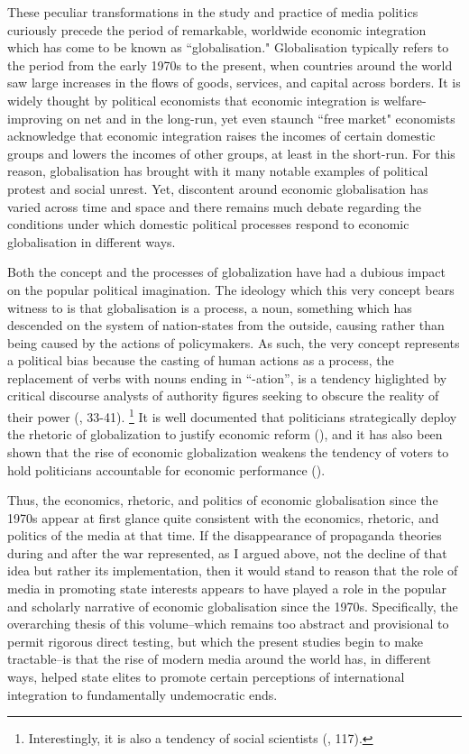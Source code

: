 These peculiar transformations in the study and practice of media politics curiously precede the
period of remarkable, worldwide economic integration which has come to be known as ``globalisation."
Globalisation typically refers to the period from the early 1970s to the present, when countries
around the world saw large increases in the flows of goods, services, and capital across borders. It
is widely thought by political economists that economic integration is welfare-improving on net and
in the long-run, yet even staunch ``free market" economists acknowledge that economic integration
raises the incomes of certain domestic groups and lowers the incomes of other groups, at least in
the short-run. For this reason, globalisation has brought with it many notable examples of political
protest and social unrest. Yet, discontent around economic globalisation has varied across time and
space and there remains much debate regarding the conditions under which domestic political
processes respond to economic globalisation in different ways.

Both the concept and the processes of globalization have had a dubious impact on the popular
political imagination. The ideology which this very concept bears witness to is that globalisation
is a process, a noun, something which has descended on the system of nation-states from the outside,
causing rather than being caused by the actions of policymakers. As such, the very concept
represents a political bias because the casting of human actions as a process, the replacement of
verbs with nouns ending in ``-ation'', is a tendency higlighted by critical discourse analysts of
authority figures seeking to obscure the reality of their power (\citealt{fowler1979language}, 33-41).
\footnote{Interestingly, it is also a tendency of social scientists (\citealt{billig2013learn}, 117).} It is well
documented that politicians strategically deploy the rhetoric of globalization to justify economic
reform (\citealt{Hay:2011dh}), and it has also been shown that the rise of economic globalization
weakens the tendency of voters to hold politicians accountable for economic performance
(\citealt{Hellwig:2007gn,Hellwig:2007jr}).

Thus, the economics, rhetoric, and politics of economic globalisation since the 1970s appear at
first glance quite consistent with the economics, rhetoric, and politics of the media at that time.
If the disappearance of propaganda theories during and after the war represented, as I argued above,
not the decline of that idea but rather its implementation, then it would stand to reason that the
role of media in promoting state interests appears to have played a role in the popular and
scholarly narrative of economic globalisation since the 1970s. Specifically, the overarching thesis
of this volume--which remains too abstract and provisional to permit rigorous direct testing, but
which the present studies begin to make tractable--is that the rise of modern media around the world
has, in different ways, helped state elites to promote certain perceptions of international
integration to fundamentally undemocratic ends.
